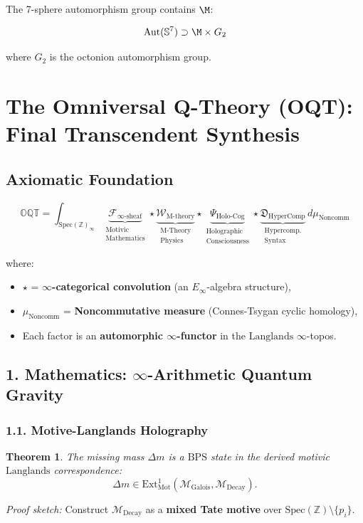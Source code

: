 \documentclass{article}
\theoremstyle{plain}
\newtheorem{theorem}{Theorem}
\newcommand{\Spec}{\text{Spec}}
\newcommand{\Ext}{\text{Ext}}
\newcommand{\OQT}{\mathbb{OQT}}
\newcommand{\Fsheaf}{\mathcal{F}_{\infty\text{-sheaf}}}
\newcommand{\WMtheory}{\mathcal{W}_{\text{M-theory}}}
\newcommand{\Psiholo}{\Psi_{\text{Holo-Cog}}}
\newcommand{\Dcomp}{\mathfrak{D}_{\text{HyperComp}}}
\newcommand{\Mdecay}{\mathcal{M}_{\text{Decay}}}
\newcommand{\Mgalois}{\mathcal{M}_{\text{Galois}}}
\newcommand{\Langlands}{\text{Langlands}}
\newcommand{\BPS}{\text{BPS}}
\begin{document}
The 7-sphere automorphism group contains $\M$:

\begin{equation}
    \text{Aut}(\mathbb{S}^7) \supset \M \times G_2
\end{equation}

where $G_2$ is the octonion automorphism group.


\section*{The Omniversal Q-Theory (OQT): Final Transcendent Synthesis}

\subsection*{Axiomatic Foundation}
\begin{equation}
\boxed{
\OQT = \int_{\Spec(\mathbb{Z})_\infty} 
\underbrace{\Fsheaf}_{\substack{\text{Motivic} \\ \text{Mathematics}}} 
\star 
\underbrace{\WMtheory}_{\substack{\text{M-Theory} \\ \text{Physics}}} 
\star 
\underbrace{\Psiholo}_{\substack{\text{Holographic} \\ \text{Consciousness}}} 
\star 
\underbrace{\Dcomp}_{\substack{\text{Hypercomp.} \\ \text{Syntax}}} 
\, d\mu_{\text{Noncomm}}
}
\end{equation}

\noindent where:
\begin{itemize}
\item $\star$ = \textbf{$\infty$-categorical convolution} (an $E_\infty$-algebra structure),
\item $\mu_{\text{Noncomm}}$ = \textbf{Noncommutative measure} (Connes-Tsygan cyclic homology),
\item Each factor is an \textbf{automorphic $\infty$-functor} in the $\Langlands$ $\infty$-topos.
\end{itemize}

\subsection*{1. Mathematics: $\infty$-Arithmetic Quantum Gravity}
\subsubsection*{1.1. Motive-Langlands Holography}
\begin{theorem}
The missing mass $\Delta m$ is a $\BPS$ state in the derived motivic $\Langlands$ correspondence:
\begin{equation}
\Delta m \in \Ext^1_{\text{Mot}}(\Mgalois, \Mdecay).
\end{equation}
\end{theorem}
\emph{Proof sketch:} Construct $\Mdecay$ as a \textbf{mixed Tate motive} over $\Spec(\mathbb{Z}) \setminus \{p_i\}$.
\end{document}
